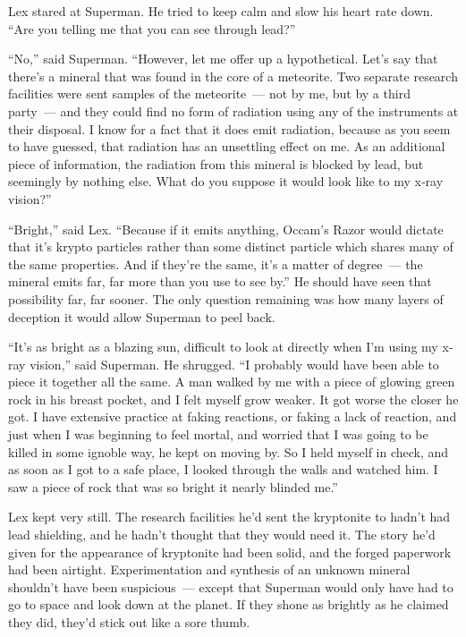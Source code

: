 \documentclass[ebook,12pt]{memoir}
\begin{document}
Lex stared at Superman. He tried to keep calm and slow his heart rate
down. ``Are you telling me that you can see through lead?''

``No,'' said Superman. ``However, let me offer up a hypothetical. Let's
say that there's a mineral that was found in the core of a meteorite.
Two separate research facilities were sent samples of the meteorite~---
not by me, but by a third party~--- and they could find no form of
radiation using any of the instruments at their disposal. I know for a
fact that it does emit radiation, because as you seem to have guessed,
that radiation has an unsettling effect on me. As an additional piece of
information, the radiation from this mineral is blocked by lead, but
seemingly by nothing else. What do you suppose it would look like to my
x‐ray vision?''

``Bright,'' said Lex. ``Because if it emits anything, Occam's Razor
would dictate that it's krypto particles rather than some distinct
particle which shares many of the same properties. And if they're the
same, it's a matter of degree~--- the mineral emits far, far more than
you use to see by.'' He should have seen that possibility far, far
sooner. The only question remaining was how many layers of deception it
would allow Superman to peel back.

``It's as bright as a blazing sun, difficult to look at directly when
I'm using my x‐ray vision,'' said Superman. He shrugged. ``I probably
would have been able to piece it together all the same. A man walked by
me with a piece of glowing green rock in his breast pocket, and I felt
myself grow weaker. It got worse the closer he got. I have extensive
practice at faking reactions, or faking a lack of reaction, and just
when I was beginning to feel mortal, and worried that I was going to be
killed in some ignoble way, he kept on moving by. So I held myself in
check, and as soon as I got to a safe place, I looked through the walls
and watched him. I saw a piece of rock that was so bright it nearly
blinded me.''

Lex kept very still. The research facilities he'd sent the kryptonite to
hadn't had lead shielding, and he hadn't thought that they would need
it. The story he'd given for the appearance of kryptonite had been
solid, and the forged paperwork had been airtight. Experimentation and
synthesis of an unknown mineral shouldn't have been suspicious~---
except that Superman would only have had to go to space and look down at
the planet. If they shone as brightly as he claimed they did, they'd
stick out like a sore thumb.
\end{document}

